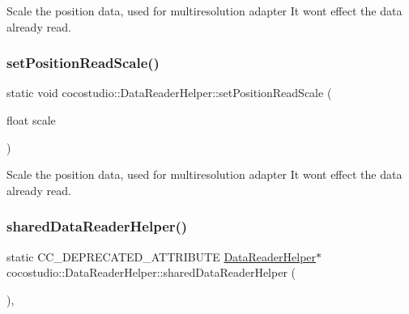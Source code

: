 Scale the position data, used for multiresolution adapter It won\textquotesingle{}t effect the data already read. \mbox{\label{classcocostudio_1_1DataReaderHelper_a55f3cd35a08c40c2c852de1c74608a34}} 
\subsubsection{\texorpdfstring{set\+Position\+Read\+Scale()}{setPositionReadScale()}\hspace{0.1cm}{\footnotesize\ttfamily [2/2]}}
{\footnotesize\ttfamily static void cocostudio\+::\+Data\+Reader\+Helper\+::set\+Position\+Read\+Scale (\begin{DoxyParamCaption}\item[{float}]{scale }\end{DoxyParamCaption})\hspace{0.3cm}{\ttfamily [static]}}

Scale the position data, used for multiresolution adapter It won\textquotesingle{}t effect the data already read. \mbox{\label{classcocostudio_1_1DataReaderHelper_a9bb0d6d948d46a153a1d7cfe53e3c406}} 
\subsubsection{\texorpdfstring{shared\+Data\+Reader\+Helper()}{sharedDataReaderHelper()}\hspace{0.1cm}{\footnotesize\ttfamily [1/2]}}
{\footnotesize\ttfamily static C\+C\+\_\+\+D\+E\+P\+R\+E\+C\+A\+T\+E\+D\+\_\+\+A\+T\+T\+R\+I\+B\+U\+TE \hyperlink{classcocostudio_1_1DataReaderHelper}{Data\+Reader\+Helper}$\ast$ cocostudio\+::\+Data\+Reader\+Helper\+::shared\+Data\+Reader\+Helper (\begin{DoxyParamCaption}{ }\end{DoxyParamCaption})\hspace{0.3cm}{\ttfamily [inline]}, {\ttfamily [static]}}

